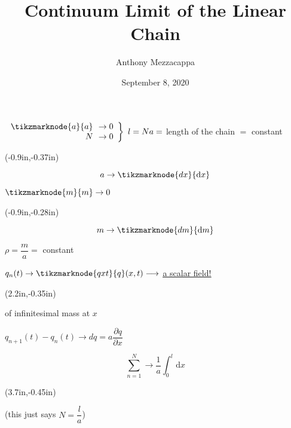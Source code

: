 \documentclass{article}
\title{Continuum Limit of the Linear Chain}
\author{Anthony Mezzacappa}
\date{September 8, 2020}
\begin{document}
\setlength{\parskip}{1em}
\maketitle

$\left.%
\begin{array}{rl}
    \tikzmarknode{a}{a} \!\!&\rightarrow 0 \\
    N \!\!&\rightarrow 0
\end{array}%
\right\rbrace ~ l = Na = $ length of the chain $=$ constant
{%
\begin{textblock*}{1in}(-0.9in,-0.37in)%
\begin{minipage}[h!]{1in}
    \begin{equation*}
        a \rightarrow \tikzmarknode{dx}{\mathrm{d} x}
    \end{equation*}
\end{minipage}%
\end{textblock*}%
}%
%
\vspace{-6pt}\quad%
$\tikzmarknode{m}{m} \rightarrow 0$
{%
\begin{textblock*}{1in}(-0.9in,-0.28in)%
\begin{minipage}[h!]{1in}
    \begin{equation*}
        m \rightarrow \tikzmarknode{dm}{\mathrm{d} m}
    \end{equation*}
\end{minipage}%
\end{textblock*}%
}
%
\quad $\rho = \dfrac{m}{a} = $ constant

\quad $q_n (t) \rightarrow \tikzmarknode{qxt}{q} ( x, t ) \longrightarrow $ \underline{\underline{ a scalar field! }}
{%
\begin{textblock*}{3in}(2.2in,-0.35in)%
\begin{minipage}[h!]{3in}
     of infinitesimal mass at $x$
\end{minipage}%
\end{textblock*}%
}

$q_{n+1} (t) - q_n (t) \rightarrow dq = a \dfrac{ \partial q }{ \partial x }$


\vspace*{-24pt} \begin{displaymath}
    \sum_{n=1}^{N} \rightarrow \dfrac{1}{a} \int_0^l \mathrm{d}x
\end{displaymath}
{%
\begin{textblock*}{3in}(3.7in,-0.45in)%
\begin{minipage}[h!]{3in}
    (this just says $N = \dfrac{l}{a}$)
\end{minipage}%
\end{textblock*}%
}
\end{document}
